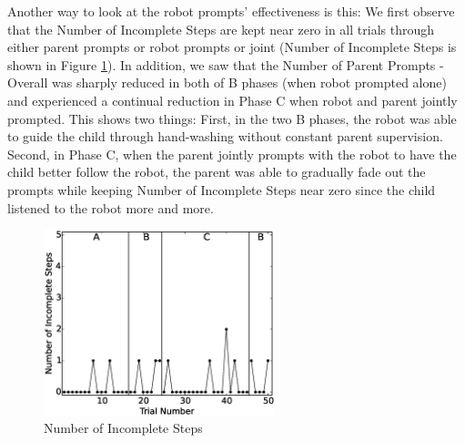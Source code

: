 \documentclass{ut-thesis}
\begin{document}
Another way to look at the robot prompts' effectiveness is this: We first observe that the Number of Incomplete Steps are kept near zero in all trials through either parent prompts or robot prompts or joint (Number of Incomplete Steps is shown in Figure \ref{fig:4NumberofIncompleteSteps}).  In addition, we saw that the Number of Parent Prompts - Overall was sharply reduced in both of B phases (when robot prompted alone) and experienced a continual reduction in Phase C when robot and parent jointly prompted.  This shows two things: First, in the two B phases, the robot was able to guide the child through hand-washing without constant parent supervision.  Second, in Phase C, when the parent jointly prompts with the robot to have the child better follow the robot, the parent was able to gradually fade out the prompts while keeping Number of Incomplete Steps near zero since the child listened to the robot more and more.
\begin{figure} [h]
	\centering
	\includegraphics[width=0.6\textwidth]{./img/data_analysis/4NumberofIncompleteSteps.eps}
	\caption{Number of Incomplete Steps}
	\label{fig:4NumberofIncompleteSteps}
\end{figure}
\end{document}
